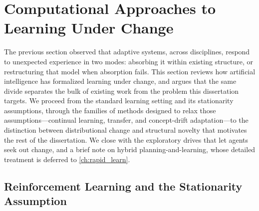%   
%
%
%

\section{Computational Approaches to Learning Under Change}
\label{sec:computational_open_world}

The previous section observed that adaptive systems, across disciplines, respond to unexpected experience in two modes: absorbing it within existing structure, or restructuring that model when absorption fails. This section reviews how artificial intelligence has formalized learning under change, and argues that the same divide separates the bulk of existing work from the problem this dissertation targets. We proceed from the standard learning setting and its stationarity assumptions, through the families of methods designed to relax those assumptions---continual learning, transfer, and concept-drift adaptation---to the distinction between distributional change and structural novelty that motivates the rest of the dissertation. We close with the exploratory drives that let agents seek out change, and a brief note on hybrid planning-and-learning, whose detailed treatment is deferred to \cref{ch:rapid_learn}.

\subsection{Reinforcement Learning and the Stationarity Assumption}
\label{sec:rl_background}


